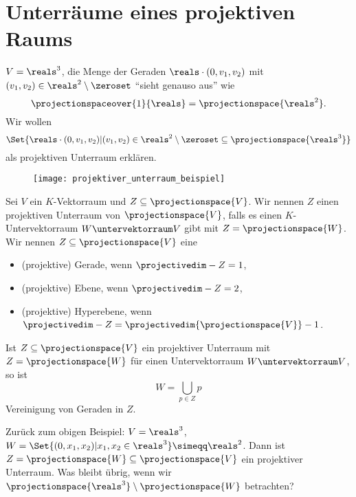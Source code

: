 \section*{Unterräume eines projektiven Raums}
\begin{beispiel}\label{projektive_unterebene}
  \( V=\reals^3 \), die Menge der Geraden \( \reals\cdot(0,v_1,v_2) \) mit \( (v_1,v_2)\in \reals^2\setminus\zeroset \) \enquote{sieht genauso aus} wie
  \begin{equation*}
    \projectionspaceover{1}{\reals}=\projectionspace{\reals^2}.
  \end{equation*}
  Wir wollen
  \begin{equation*}
    \Set{\reals\cdot (0,v_1,v_2)|(v_1,v_2)\in \reals^2\setminus\zeroset\subseteq \projectionspace{\reals^3}}
  \end{equation*}
  als projektiven Unterraum erklären.
  \begin{figure}[H]
    \centering
    \texttt{[image: projektiver\_unterraum\_beispiel]}
    \label{fig:projektiver_unterraum_beispiel}
  \end{figure}
\end{beispiel}
\begin{definition*}
  Sei \( V \) ein \( K \)-Vektorraum und \( Z\subseteq \projectionspace{V} \). Wir nennen \( Z \) einen projektiven Unterraum von \( \projectionspace{V} \), falls es einen \( K \)-Untervektorraum \( W\untervektorraum V \) gibt mit \( Z=\projectionspace{W} \). Wir nennen \( Z\subseteq \projectionspace{V} \) eine
  \begin{itemize}
    \item (projektive) Gerade, wenn \( \projectivedim-{Z}=1 \),
    \item (projektive) Ebene, wenn  \( \projectivedim-{Z}=2 \),
    \item (projektive) Hyperebene, wenn \( \projectivedim-{Z}=\projectivedim{\projectionspace{V}}-1 \).
  \end{itemize}
\end{definition*}
\begin{bemerkung*}
  Ist \( Z\subseteq \projectionspace{V} \) ein projektiver Unterraum mit \( Z=\projectionspace{W} \) für einen Untervektorraum \( W\untervektorraum V\), so ist
  \begin{equation*}
    W=\bigcup_{p\in Z} p
  \end{equation*}
  Vereinigung von Geraden in \( Z \).
\end{bemerkung*}
Zurück zum obigen Beispiel: \( V=\reals^3 \), \( W=\Set{(0,x_1,x_2)|x_1,x_2\in\reals^3}\simeqq \reals^2 \). Dann ist \( Z=\projectionspace{W}\subseteq \projectionspace{V} \) ein projektiver Unterraum. Was bleibt übrig, wenn wir \( \projectionspace{\reals^3}\setminus\projectionspace{W} \) betrachten?
